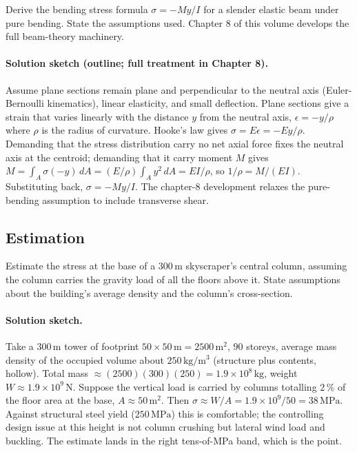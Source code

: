 \begin{exercise}
Derive the bending stress formula $\sigma = -My/I$ for a slender
elastic beam under pure bending. State the assumptions used. Chapter
8 of this volume develops the full beam-theory machinery.
\paragraph{Solution sketch (outline; full treatment in Chapter 8).}
Assume plane sections remain plane and perpendicular to the neutral
axis (Euler-Bernoulli kinematics), linear elasticity, and small
deflection. Plane sections give a strain that varies linearly with the
distance $y$ from the neutral axis, $\epsilon = -y/\rho$ where $\rho$ is
the radius of curvature. Hooke's law gives $\sigma = E\epsilon =
-Ey/\rho$. Demanding that the stress distribution carry no net axial
force fixes the neutral axis at the centroid; demanding that it carry
moment $M$ gives $M = \int_A \sigma(-y)\,dA = (E/\rho)\int_A y^2\,dA =
EI/\rho$, so $1/\rho = M/(EI)$. Substituting back, $\sigma = -My/I$.
The chapter-8 development relaxes the pure-bending assumption to include
transverse shear.
\end{exercise}

\subsection*{Estimation}

\begin{exercise}
Estimate the stress at the base of a $300\,\si{\meter}$ skyscraper's
central column, assuming the column carries the gravity load of all
the floors above it. State assumptions about the building's average
density and the column's cross-section.
\paragraph{Solution sketch.} Take a $300\,\si{\meter}$ tower of
footprint $50 \times 50\,\si{\meter} = 2500\,\si{\meter}^2$, $90$
storeys, average mass density of the occupied volume about $250\,\si{
\kilogram\per\meter\cubed}$ (structure plus contents, hollow). Total
mass $\approx (2500)(300)(250) = 1.9\times 10^8\,\si{\kilogram}$,
weight $W \approx 1.9\times 10^9\,\text{N}$. Suppose the vertical load
is carried by columns totalling $2\,\%$ of the floor area at the base,
$A \approx 50\,\si{\meter}^2$. Then $\sigma \approx W/A = 1.9\times 10^9
/50 = 38\,\text{MPa}$. Against structural steel yield ($250\,\text{MPa}$)
this is comfortable; the controlling design issue at this height is not
column crushing but lateral wind load and buckling. The estimate lands
in the right tens-of-MPa band, which is the point.
\end{exercise}

